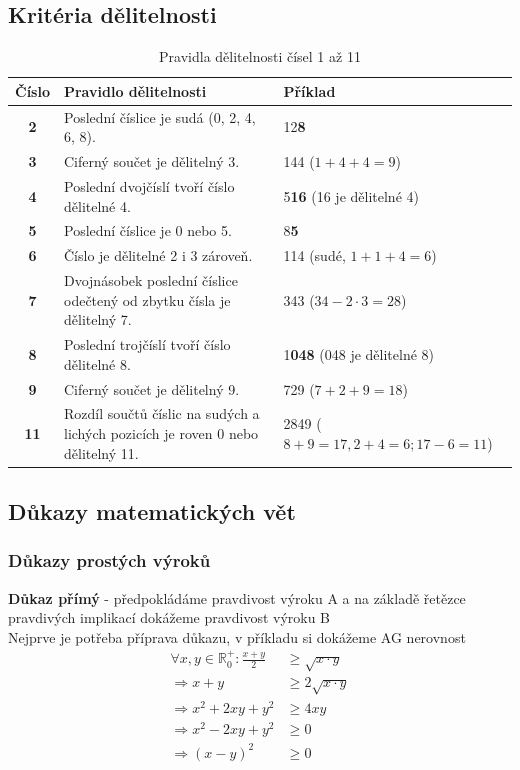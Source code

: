 \documentclass[12pt]{article}
\begin{document}
\subsection*{Kritéria dělitelnosti}
\begin{table}[H]
\centering
\renewcommand{\arraystretch}{1.3} %
\begin{tabular}{|c|p{8cm}|l|}
\hline
\textbf{Číslo} & \textbf{Pravidlo dělitelnosti} & \textbf{Příklad} \\
\hline
\textbf{2} & Poslední číslice je sudá (0, 2, 4, 6, 8). & 12\textbf{8} \\
\hline
\textbf{3} & Ciferný součet je dělitelný 3. & 144 ($1+4+4=9$) \\
\hline
\textbf{4} & Poslední dvojčíslí tvoří číslo dělitelné 4. & 5\textbf{16} (16 je dělitelné 4) \\
\hline
\textbf{5} & Poslední číslice je 0 nebo 5. & 8\textbf{5} \\
\hline
\textbf{6} & Číslo je dělitelné 2 i 3 zároveň. & 114 (sudé, $1+1+4=6$) \\
\hline
\textbf{7} & Dvojnásobek poslední číslice odečtený od zbytku čísla je dělitelný 7. & 343 ($34 - 2 \cdot 3 = 28$) \\
\hline
\textbf{8} & Poslední trojčíslí tvoří číslo dělitelné 8. & 1\textbf{048} (048 je dělitelné 8) \\
\hline
\textbf{9} & Ciferný součet je dělitelný 9. & 729 ($7+2+9=18$) \\
\hline
\textbf{11} & Rozdíl součtů číslic na sudých a lichých pozicích je roven 0 nebo dělitelný 11. & 2849 ($8+9=17, 2+4=6; 17-6=11$) \\
\hline
\end{tabular}
\caption*{Pravidla dělitelnosti čísel 1 až 11}
\label{tab:delitelnost}
\end{table}

\subsection*{Důkazy matematických vět}
\subsubsection*{Důkazy prostých výroků}
\textbf{Důkaz přímý} - předpokládáme pravdivost výroku A a na základě řetězce pravdivých implikací dokážeme pravdivost výroku B\\
Nejprve je potřeba příprava důkazu, v příkladu si dokážeme AG nerovnost 
\begin{align*}
\forall x,y \in \mathbb{R}_0^+ : \frac{x+y}{2}&\geq \sqrt{x\cdot y}\\
\Rightarrow x+y &\geq 2\sqrt{x\cdot y}\\
\Rightarrow x^2 + 2xy + y^2 &\geq 4xy\\
\Rightarrow x^2 - 2xy + y^2 &\geq 0\\
\Rightarrow (x-y)^2 &\geq 0\\ 
\end{align*}
\end{document}

